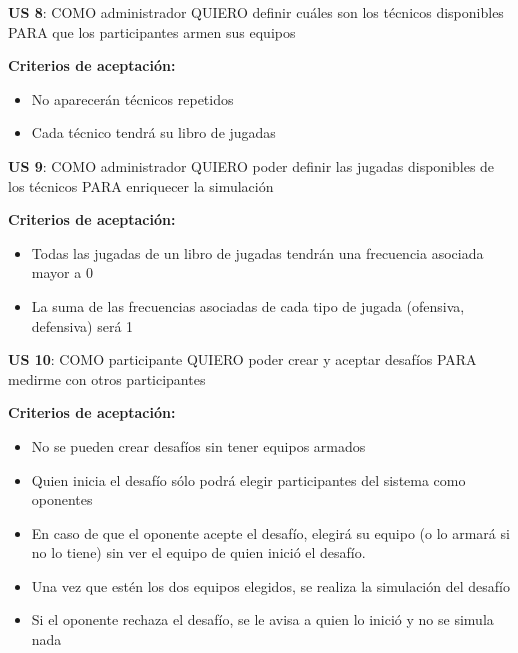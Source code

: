 \begin{tcolorbox}
\textbf{US 8}: COMO administrador QUIERO definir cuáles son los técnicos disponibles PARA que los participantes armen sus equipos

\vline

\textbf{Criterios de aceptación:}
\begin{itemize}
\item No aparecerán técnicos repetidos
\item Cada técnico tendrá su libro de jugadas
\end{itemize}
\end{tcolorbox}
\vspace{10pt}


\begin{tcolorbox}
\textbf{US 9}: COMO administrador QUIERO poder definir las jugadas disponibles de los técnicos PARA enriquecer la simulación

\vline

\textbf{Criterios de aceptación:}
\begin{itemize}
\item Todas las jugadas de un libro de jugadas tendrán una frecuencia asociada mayor a 0
\item La suma de las frecuencias asociadas de cada tipo de jugada (ofensiva, defensiva) será 1
\end{itemize}
\end{tcolorbox}
\vspace{10pt}


\begin{tcolorbox}
\textbf{US 10}: COMO participante QUIERO poder crear y aceptar desafíos PARA medirme con otros participantes

\vline

\textbf{Criterios de aceptación:}
\begin{itemize}
\item No se pueden crear desafíos sin tener equipos armados
\item Quien inicia el desafío sólo podrá elegir participantes del sistema como oponentes
\item En caso de que el oponente acepte el desafío, elegirá su equipo (o lo armará si no lo tiene) sin ver el equipo de quien inició el desafío.
\item Una vez que estén los dos equipos elegidos, se realiza la simulación del desafío
\item Si el oponente rechaza el desafío, se le avisa a quien lo inició y no se simula nada
\end{itemize}
\end{tcolorbox}
\vspace{10pt}


